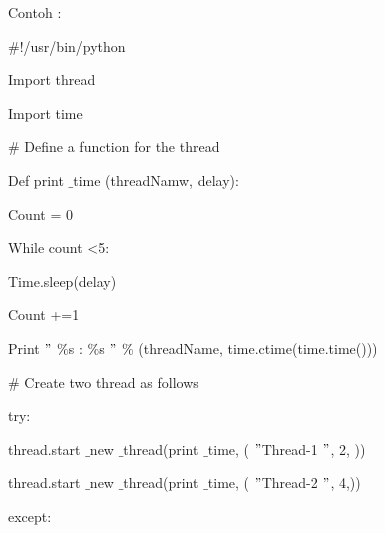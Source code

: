 

\newpage

\vspace{12pt}
\vspace{12pt}
\noindent 
Contoh : \par
\noindent 
{\fontsize{10pt}{10pt}\selectfont  $  \#  $!/usr/bin/python} \par
\vspace{10pt}
\noindent 
{\fontsize{10pt}{10pt}\selectfont Import thread} \par
\noindent 
{\fontsize{10pt}{10pt}\selectfont Import time} \par
\vspace{10pt}
\noindent 
{\fontsize{10pt}{10pt}\selectfont  $  \#  $ Define a function for the thread} \par
\noindent 
{\fontsize{10pt}{10pt}\selectfont Def print $  \_  $time (threadNamw, delay):} \par
\noindent 
{\fontsize{10pt}{10pt}\selectfont  \hspace*{0.5in} Count = 0} \par
\noindent 
{\fontsize{10pt}{10pt}\selectfont  \hspace*{0.5in} While count <5:} \par
\noindent 
{\fontsize{10pt}{10pt}\selectfont  \hspace*{0.5in} Time.sleep(delay)} \par
\noindent 
{\fontsize{10pt}{10pt}\selectfont  \hspace*{0.5in} Count +=1} \par
\noindent 
{\fontsize{10pt}{10pt}\selectfont  \hspace*{0.5in} Print  $ " $ $  \%  $s :  $  \%  $s $ " $  $  \%  $ (threadName, time.ctime(time.time()))} \par
\vspace{10pt}
\noindent 
{\fontsize{10pt}{10pt}\selectfont  $  \#  $ Create two thread as follows} \par
\noindent 
{\fontsize{10pt}{10pt}\selectfont try:} \par
\noindent 
{\fontsize{10pt}{10pt}\selectfont  thread.start $  \_  $new $  \_  $thread(print $  \_  $time, ( $ " $Thread-1 $ " $, 2, ))} \par
\noindent 
{\fontsize{10pt}{10pt}\selectfont  thread.start $  \_  $new $  \_  $thread(print $  \_  $time, ( $ " $Thread-2 $ " $, 4,))} \par
\noindent 
{\fontsize{10pt}{10pt}\selectfont except:} \par
